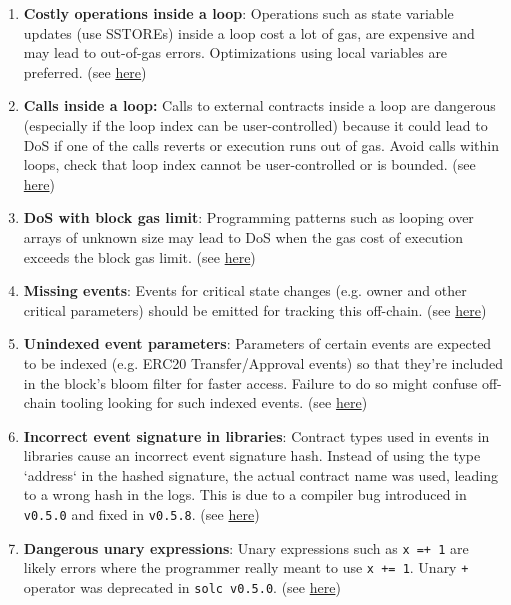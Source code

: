 \begin{enumerate}
\item\textbf{Costly operations inside a loop}: Operations such as state variable updates (use SSTOREs) inside a loop cost a lot of gas, are expensive and may lead to out-of-gas errors. Optimizations using local variables are preferred. (see \href{https://github.com/crytic/slither/wiki/Detector-Documentation\#costly-operations-inside-a-loop}{here})

\item\textbf{Calls inside a loop: }Calls to external contracts inside a loop are dangerous (especially if the loop index can be user-controlled) because it could lead to DoS if one of the calls reverts or execution runs out of gas. Avoid calls within loops, check that loop index cannot be user-controlled or is bounded. (see \href{https://swcregistry.io/docs/SWC-113}{here})

\item\textbf{DoS with block gas limit}: Programming patterns such as looping over arrays of unknown size may lead to DoS when the gas cost of execution exceeds the block gas limit. (see \href{https://swcregistry.io/docs/SWC-128}{here})

\item\textbf{Missing events}: Events for critical state changes (e.g. owner and other critical parameters) should be emitted for tracking this off-chain. (see \href{https://github.com/crytic/slither/wiki/Detector-Documentation\#missing-events-access-control}{here})

\item\textbf{Unindexed event parameters}: Parameters of certain events are expected to be indexed (e.g. ERC20 Transfer/Approval events) so that they’re included in the block’s bloom filter for faster access. Failure to do so might confuse off-chain tooling looking for such indexed events. (see \href{https://github.com/crytic/slither/wiki/Detector-Documentation\#unindexed-erc20-event-oarameters}{here})

\item\textbf{Incorrect event signature in libraries}: Contract types used in events in libraries cause an incorrect event signature hash. Instead of using the type `address` in the hashed signature, the actual contract name was used, leading to a wrong hash in the logs. This is due to a compiler bug introduced in \verb|v0.5.0| and fixed in \verb|v0.5.8|. (see \href{https://docs.soliditylang.org/en/v0.8.1/bugs.html}{here})

\item\textbf{Dangerous unary expressions}: Unary expressions such as \verb|x =+ 1| are likely errors where the programmer really meant to use \verb|x += 1|. Unary \verb|+| operator was deprecated in \verb|solc v0.5.0|. (see \href{https://swcregistry.io/docs/SWC-129}{here})


\end{enumerate}
